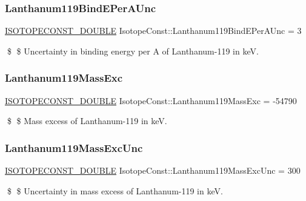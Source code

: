 \subsubsection{\texorpdfstring{Lanthanum119\+Bind\+E\+Per\+A\+Unc}{Lanthanum119BindEPerAUnc}}
{\footnotesize\ttfamily \mbox{\hyperlink{group___isotope_const-_macros_ga8f45a7272ce02c0b4c65c44636ed719a}{I\+S\+O\+T\+O\+P\+E\+C\+O\+N\+S\+T\+\_\+\+D\+O\+U\+B\+LE}} Isotope\+Const\+::\+Lanthanum119\+Bind\+E\+Per\+A\+Unc = 3}

\$ \$ Uncertainty in binding energy per A of Lanthanum-\/119 in keV. \mbox{\label{group___isotope_const-_lanthanum-_la119_gaa6a0079171891d69bf4199f2511800c2}} 
\subsubsection{\texorpdfstring{Lanthanum119\+Mass\+Exc}{Lanthanum119MassExc}}
{\footnotesize\ttfamily \mbox{\hyperlink{group___isotope_const-_macros_ga8f45a7272ce02c0b4c65c44636ed719a}{I\+S\+O\+T\+O\+P\+E\+C\+O\+N\+S\+T\+\_\+\+D\+O\+U\+B\+LE}} Isotope\+Const\+::\+Lanthanum119\+Mass\+Exc = -\/54790}

\$ \$ Mass excess of Lanthanum-\/119 in keV. \mbox{\label{group___isotope_const-_lanthanum-_la119_ga9f29b6773dd712f135f195cf72c91f19}} 
\subsubsection{\texorpdfstring{Lanthanum119\+Mass\+Exc\+Unc}{Lanthanum119MassExcUnc}}
{\footnotesize\ttfamily \mbox{\hyperlink{group___isotope_const-_macros_ga8f45a7272ce02c0b4c65c44636ed719a}{I\+S\+O\+T\+O\+P\+E\+C\+O\+N\+S\+T\+\_\+\+D\+O\+U\+B\+LE}} Isotope\+Const\+::\+Lanthanum119\+Mass\+Exc\+Unc = 300}

\$ \$ Uncertainty in mass excess of Lanthanum-\/119 in keV. \mbox{\label{group___isotope_const-_lanthanum-_la119_ga20ba3762f4ce8d78456752b732ae9caf}} 
